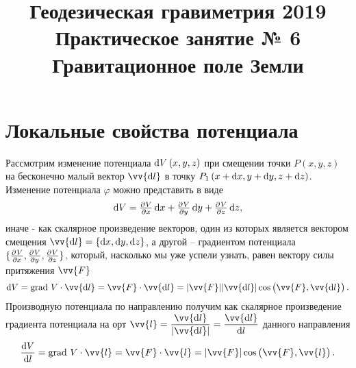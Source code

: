 \documentclass[11pt, a4paper]{article}
\title{{\Large Геодезическая гравиметрия 2019}\\ 
    {\bf\Large Практическое занятие № 6} \\
{\Large Гравитационное поле Земли}}
\author{}
\date{\DTMusedate{lessondate}}
\theoremstyle{plain}
\theoremstyle{definition}
\theoremstyle{remark}
\renewcommand{\phi}{\ensuremath{\varphi}}
\begin{document}
\maketitle
\section{Локальные свойства потенциала}
Рассмотрим изменение потенциала $\dif V \left(x, y, z\right)$ при смещении точки $P\left( x, y,z \right)$ на бесконечно малый вектор $\vv{\dif l}$ в точку $P_1\left( x + \dif x, y + \dif y, z + \dif z \right)$.
Изменение потенциала $\phi$ можно представить в виде
\begin{equation*}
    \dif V = \pd{V}{x}\dif x + \pd{V}{y}\dif y + \pd{V}{z}\dif z, 
\end{equation*}
иначе - как скалярное произведение векторов, один из которых является вектором смещения $\vv{\dif l} = \{\dif x, \dif y, \dif z\}$, а другой – градиентом потенциала $\{\pd{V}{x}, \pd{V}{y}, \pd{V}{z}\}$, который, насколько мы уже успели узнать, равен вектору силы притяжения $\vv{F}$
\begin{equation*}
    \dif V = \text{grad } V \cdot \vv{\dif l} = \vv{F} \cdot \vv{\dif l} = |\vv{F}| |\vv{\dif l}| \cos \left(\vv{F}, \vv{\dif l}\right).
\end{equation*}
Производную потенциала по направлению получим как скалярное произведение градиента потенциала на орт $\vv{l} = \dfrac{\vv{\dif l}}{|\vv{\dif l}|} = \dfrac{\vv{\dif l}}{\dif l}$ данного направления 
\begin{equation}
    \dfrac{\dif V}{\dif l} = \text{grad } V \cdot \vv{l} = \vv{F} \cdot \vv{l} = | \vv{F}| \cos \left(\vv{F}, \vv{l}\right).
\end{equation}
\end{document}

